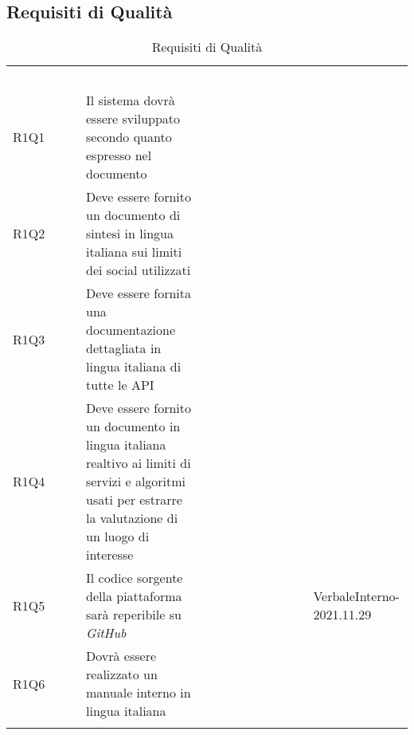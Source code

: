 \subsection{Requisiti di Qualità}


\renewcommand{\arraystretch}{1.5}
\begin{longtable}{ m{}<{\centering}  m{}<{\centering}  m{}<{\centering}  m{}<{\centering}}
	\rowcolor{darkblue}
	\textcolor{white}{\textbf{Requisito}} &\textcolor{white}{\textbf{Descrizione}}& \textcolor{white}{\textbf{Classificazione}} & \textcolor{white}{\textbf{Fonti}}\\ 

	R1Q1 & Il sistema dovrà essere sviluppato secondo quanto espresso nel documento \textit{\NdP} & \Ob & \Di \\
	
	R1Q2 & Deve essere fornito un documento di sintesi in lingua italiana sui limiti dei social utilizzati & \Ob & \Ca \\
	
	R1Q3 & Deve essere fornita una documentazione dettagliata in lingua italiana di tutte le API & \Ob & \Ca \\

	R1Q4 & Deve essere fornito un documento in lingua italiana realtivo ai limiti di servizi e algoritmi usati per estrarre la valutazione di un luogo di interesse & \Ob & \Ca \\

	R1Q5 & Il codice sorgente della piattaforma sarà reperibile su \textit{GitHub} & \Ob & VerbaleInterno-2021.11.29 \\
	
	R1Q6 & Dovrà essere realizzato un manuale interno in lingua italiana  & \Ob & \Di \\

	\hiderowcolors \caption{Requisiti di Qualità}
\end{longtable}

\clearpage